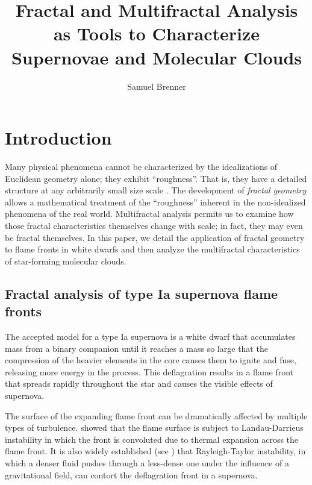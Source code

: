 \documentclass[iop]{emulateapj}
\begin{document}
%
\title{Fractal and Multifractal Analysis as Tools to Characterize Supernovae and Molecular Clouds}
%
\author{Samuel Brenner}
%
%
%
%
%
\begin{abstract}
\end{abstract}
%
%
%
%
%
%

\section{Introduction}
Many physical phenomena cannot be characterized by the idealizations of Euclidean geometry alone; they exhibit ``roughness''. That is, they have a detailed structure at any arbitrarily small size scale \citep{Falconer2003}. The development of \textit{fractal geometry} allows a mathematical treatment of the ``roughness'' inherent in the non-idealized phenomena of the real world. Multifractal analysis permits us to examine how those fractal characteristics themselves change with scale; in fact, they may even be fractal themselves. In this paper, we detail the application of fractal geometry to flame fronts in white dwarfs and then analyze the multifractal characteristics of star-forming molecular clouds.

\subsection{Fractal analysis of type Ia supernova flame fronts}
The accepted model for a type Ia supernova is a white dwarf that accumulates mass from a binary companion until it reaches a mass so large that the compression of the heavier elements in the core causes them to ignite and fuse, releasing more energy in the process. This deflagration results in a flame front that spreads rapidly throughout the star and causes the visible effects of supernova.

The surface of the expanding flame front can be dramatically affected by multiple types of turbulence. \cite{Landau1959} showed that the flame surface is subject to Landau-Darrieus instability in which the front is convoluted due to thermal expansion across the flame front. It is also widely established (see \cite{Kull1991}) that Rayleigh-Taylor instability, in which a denser fluid pushes through a less-dense one under the influence of a gravitational field, can contort the deflagration front in a supernova. 
\end{document}
